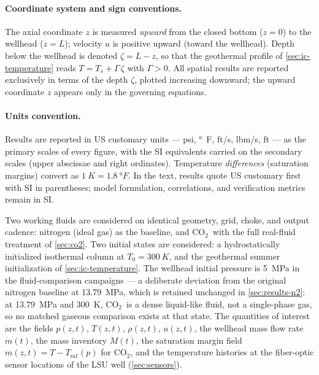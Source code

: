 \documentclass[11pt]{article}
\newcommand{\mdot}{\dot{m}}
\newcommand{\co}{CO$_2$}
\begin{document}
\paragraph{Coordinate system and sign conventions.} The axial coordinate
$z$ is measured \emph{upward} from the closed bottom ($z=0$) to the
wellhead ($z=L$); velocity $u$ is positive upward (toward the wellhead).
Depth below the wellhead is denoted $\zeta = L - z$, so that the
geothermal profile of \cref{sec:ic-temperature} reads
$T = T_s + \Gamma\,\zeta$ with $\Gamma > 0$. All spatial results are
reported exclusively in terms of the depth $\zeta$, plotted increasing
downward; the upward coordinate $z$ appears only in the governing
equations.

\paragraph{Units convention.} Results are reported in US customary
units --- psi, \si{\degree F}, ft/s, lbm/s, ft --- as the primary
scales of every figure, with the SI equivalents carried on the
secondary scales (upper abscissae and right ordinates). Temperature
\emph{differences} (saturation margins) convert as
$\SI{1}{K} = \SI{1.8}{\degree F}$. In the text, results quote US
customary first with SI in parentheses; model formulation,
correlations, and verification metrics remain in SI.

Two working fluids are considered on identical geometry, grid, choke,
and output cadence: nitrogen (ideal gas) as the baseline, and \co\ with
the full real-fluid treatment of \cref{sec:co2}. Two initial states are
considered: a hydrostatically initialized isothermal column at
$T_0=\SI{300}{K}$, and the geothermal summer initialization of
\cref{sec:ic-temperature}. The wellhead initial pressure is \SI{5}{MPa}
in the fluid-comparison campaigns --- a deliberate deviation from the
original nitrogen baseline at \SI{13.79}{MPa}, which is retained
unchanged in \cref{sec:results-n2}: at \SI{13.79}{MPa} and \SI{300}{K},
\co\ is a dense liquid-like fluid, not a single-phase gas, so no matched
gaseous comparison exists at that state. The quantities of interest are
the fields $p(z,t)$, $T(z,t)$, $\rho(z,t)$, $u(z,t)$, the wellhead mass
flow rate $\mdot(t)$, the mass inventory $M(t)$, the saturation margin
field $m(z,t) = T - T_{\mathrm{sat}}(p)$ for \co, and the temperature
histories at the fiber-optic sensor locations of the LSU well
(\cref{sec:sensors}).

\end{document}
